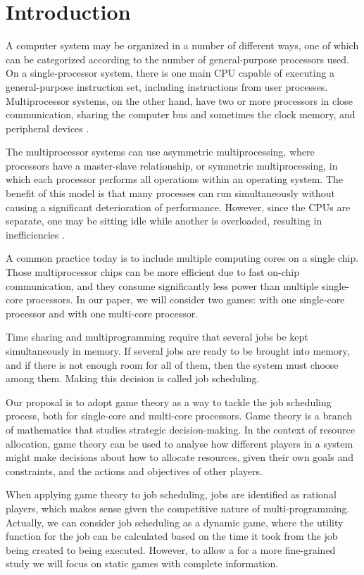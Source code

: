 \section{Introduction}
A computer system may be organized in a number of different ways, one of which can be categorized according to the number of general-purpose processors used. On a single-processor system, there is one main CPU capable of executing a general-purpose instruction set, including instructions from user processes. Multiprocessor systems, on the other hand, have two or more processors in close communication, sharing the computer bus and sometimes the clock memory, and peripheral devices \cite{10.5555/2490781}.

The multiprocessor systems can use asymmetric multiprocessing, where processors have a master-slave relationship, or symmetric multiprocessing, in which each processor performs all operations within an operating system. The benefit of this model is that many processes can run simultaneously without causing a significant deterioration of performance. However, since the CPUs are separate, one may be sitting idle while another is overloaded, resulting in inefficiencies \cite{10.1145/1463822.1463838}.

A common practice today is to include multiple computing cores on a single chip. Those multiprocessor chips can be more efficient due to fast on-chip communication, and they consume significantly less power than multiple single-core processors. In our paper, we will consider two games: with one single-core processor and with one multi-core processor. 

Time sharing and multiprogramming require that several jobs be kept simultaneously in memory. If several jobs are ready to be brought into memory, and if there is not enough room for all of them, then the system must choose among them. Making this decision is called job scheduling. 

Our proposal is to adopt game theory as a way to tackle the job scheduling process, both for single-core and multi-core processors. Game theory is a branch of mathematics that studies strategic decision-making. In the context of resource allocation, game theory can be used to analyse how different players in a system might make decisions about how to allocate resources, given their own goals and constraints, and the actions and objectives of other players. 

When applying game theory to job scheduling, jobs are identified as rational players, which makes sense given the competitive nature of multi-programming. Actually, we can consider job scheduling as a dynamic game, where the utility function for the job can be calculated based on the time it took from the job being created to being executed. However, to allow a for a more fine-grained study we will focus on static games with complete information.

